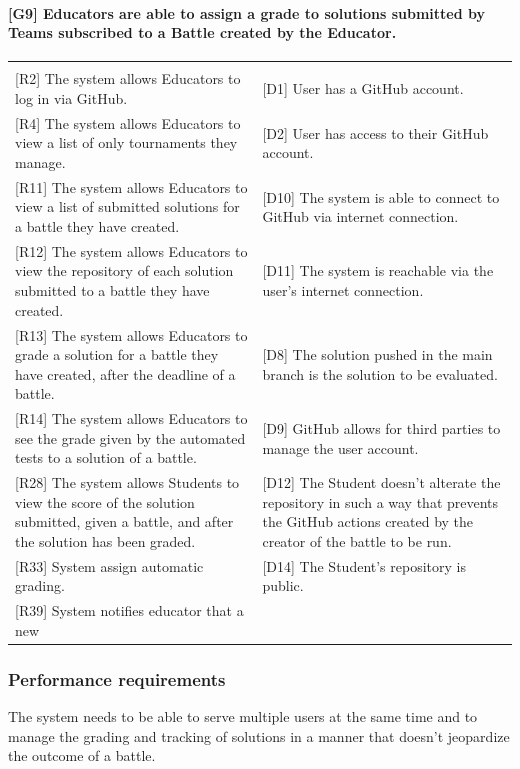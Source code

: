 \documentclass{article}
\begin{document}
\paragraph{[G9] Educators are able to assign a grade to solutions submitted by Teams subscribed to a Battle created by the Educator.}
\begin{center}
\begin{tabular}{|m{20em}|m{20em}|}
\hline
& \\
{[R2]} The system allows Educators to log in via GitHub. & 
{[D1]} User has a GitHub account.\\
{[R4]} The system allows Educators to view a list of only tournaments they manage. & 
{[D2]} User has access to their GitHub account.\\
{[R11]} The system allows Educators to view a list of submitted solutions for a battle they have created. & 
{[D10]} The system is able to connect to GitHub via internet connection.\\
{[R12]} The system allows Educators to view the repository of each solution submitted to a battle they have created. & 
{[D11]} The system is reachable via the user's internet connection.\\
{[R13]} The system allows Educators to grade a solution for a battle they have created, after the deadline of a battle. & 
{[D8]} The solution pushed in the main branch is the solution to be evaluated.\\
{[R14]} The system allows Educators to see the grade given by the automated tests to a solution of a battle. & 
{[D9]} GitHub allows for third parties to manage the user account.\\
{[R28]} The system allows Students to view the score of the solution submitted, given a battle, and after the solution has been graded. & 
{[D12]} The Student doesn't alterate the repository in such a way that prevents the GitHub actions created by the creator of the battle to be run.\\
{[R33]} System assign automatic grading. & 
{[D14]} The Student's repository is public.\\
{[R39]} System notifies educator that a new  &  \\
\hline
\end{tabular}
\end{center}

\subsubsection{Performance requirements}
The system needs to be able to serve multiple users at the same time and to manage the grading and tracking of solutions in a manner that doesn’t jeopardize the outcome of a battle.
\end{document}

